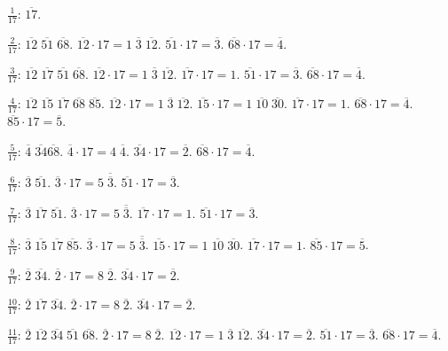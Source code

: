 \documentclass{article}
\begin{document}
$\frac{1}{17}$: $\overline{17}$.

$\frac{2}{17}$: $\overline{12} \; \overline{51} \; \overline{68}$.
$\overline{12} \cdot 17 = 1 \; \overline{3} \; \overline{12}$.
$\overline{51} \cdot 17 = \overline{3}$.
$\overline{68} \cdot 17 = \overline{4}$.

$\frac{3}{17}$: $\overline{12} \; \overline{17} \; \overline{51} \; \overline{68}$. 
$\overline{12} \cdot 17 = 1 \; \overline{3} \; \overline{12}$.
$\overline{17} \cdot 17 = 1$.
$\overline{51} \cdot 17 = \overline{3}$.
$\overline{68} \cdot 17 = \overline{4}$.

$\frac{4}{17}$: $\overline{12} \; \overline{15} \; \overline{17} \; \overline{68} \; \overline{85}$.
$\overline{12} \cdot 17 = 1 \; \overline{3} \; \overline{12}$.
$\overline{15} \cdot 17 = 1 \; \overline{10} \; \overline{30}$.
$\overline{17} \cdot 17 = 1$.
$\overline{68} \cdot 17 = \overline{4}$.
$\overline{85} \cdot 17 = \overline{5}$.

$\frac{5}{17}$: $\overline{4} \; \overline{34} \overline{68}$.
$\overline{4} \cdot 17 = 4 \; \overline{4}$.
$\overline{34} \cdot 17 = \overline{2}$.
$\overline{68} \cdot 17 = \overline{4}$.

$\frac{6}{17}$: $\overline{3} \; \overline{51}$.
$\overline{3} \cdot 17 = 5 \; \overline{\overline{3}}$.
$\overline{51} \cdot 17 = \overline{3}$.

$\frac{7}{17}$: $\overline{3} \; \overline{17} \; \overline{51}$.
$\overline{3} \cdot 17 = 5 \; \overline{\overline{3}}$.
$\overline{17} \cdot 17 =1$.
$\overline{51} \cdot 17 = \overline{3}$.

$\frac{8}{17}$: $\overline{3} \; \overline{15} \; \overline{17} \; \overline{85}$.
$\overline{3} \cdot 17 = 5 \; \overline{\overline{3}}$.
$\overline{15} \cdot 17 = 1 \; \overline{10} \; \overline{30}$.
$\overline{17} \cdot 17 = 1$.
$\overline{85} \cdot 17 = \overline{5}$.

$\frac{9}{17}$: $\overline{2} \; \overline{34}$.
$\overline{2} \cdot 17 = 8 \; \overline{2}$.
$\overline{34} \cdot 17 = \overline{2}$.

$\frac{10}{17}$: $\overline{2} \; \overline{17} \; \overline{34}$.
$\overline{2} \cdot 17 = 8 \; \overline{2}$.
$\overline{34} \cdot 17 = \overline{2}$.

$\frac{11}{17}$: $\overline{2} \; \overline{12} \; \overline{34} \; \overline{51} \; \overline{68}$.
$\overline{2} \cdot 17 = 8 \; \overline{2}$.
$\overline{12} \cdot 17 = 1 \; \overline{3} \; \overline{12}$.
$\overline{34} \cdot 17 = \overline{2}$.
$\overline{51} \cdot 17 = \overline{3}$.
$\overline{68} \cdot 17 = \overline{4}$.
\end{document}
